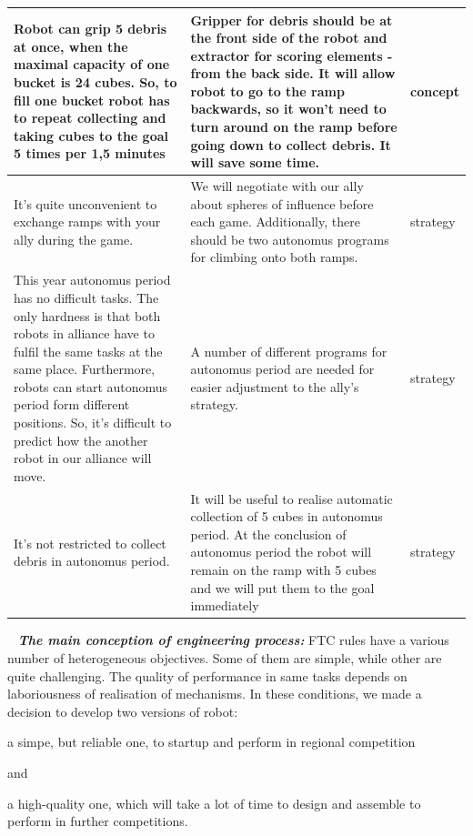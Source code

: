 \begin{table}[H]
\begin{center}
\begin{tabular}{|p{0.4\linewidth}|p{0.5\linewidth}|p{0.1\linewidth}|}
				\hline
				Robot can grip 5 debris at once, when the maximal capacity of one bucket is 24 cubes. So, to fill one bucket robot has to repeat collecting and taking cubes to the goal 5 times per 1,5 minutes & Gripper for debris should be at the front side of the robot and extractor for scoring elements - from the back side. It will allow robot to go to the ramp backwards, so it won't need to turn around on the ramp before going down to collect debris. It will save some time. & concept \\
				\hline
				It's quite unconvenient to exchange ramps with your ally during the game. & We will negotiate with our ally about spheres of influence before each game. Additionally, there should be two autonomus programs for climbing onto both ramps. & strategy \\
				\hline
				This year autonomus period has no difficult tasks. The only hardness is that both robots in alliance have to fulfil the same tasks at the same place. Furthermore, robots can start autonomus period form different positions. So, it's difficult to predict how the another robot in our alliance will move. & A number of different programs for autonomus period are needed for easier adjustment to the ally's strategy. & strategy \\
				\hline
				It's not restricted to collect debris in autonomus period. & It will be useful to realise automatic collection of 5 cubes in autonomus period. At the conclusion of autonomus period the robot will remain on the ramp with 5 cubes and we will put them to the goal immediately & strategy \\
				\hline
			\end{tabular}
		\end{center}
	\end{table}
	
	 \newline
	\textit{\textbf{The main conception of engineering process:}} FTC rules have a various number of heterogeneous objectives. Some of them are simple, while other are quite challenging. The quality of performance in same tasks depends on laboriousness of realisation of mechanisms. \newline
	In these conditions, we made a decision to develop two versions of robot:
	\begin{enumerate*}
		\item a simpe, but reliable one, to startup and perform in regional competition
		
		and
		
		\item a high-quality one, which will take a lot of time to design and assemble to perform in further competitions.
		
	\end{enumerate*}
	
